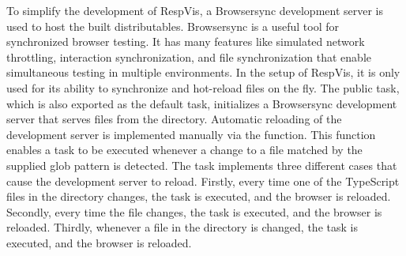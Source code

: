 To simplify the development of RespVis, a Browsersync
\parencite{Browsersync} development server is used to host the built
distributables.  Browsersync is a useful tool for synchronized browser
testing.  It has many features like simulated network throttling,
interaction synchronization, and file synchronization that enable
simultaneous testing in multiple environments.  In the setup of
RespVis, it is only used for its ability to synchronize and hot-reload
files on the fly.  The public  task, which is also
exported as the default task, initializes a Browsersync development
server that serves files from the  directory.  Automatic
reloading of the development server is implemented manually via the
 function.  This function enables a task to be
executed whenever a change to a file matched by the supplied glob
pattern is detected.  The  task implements three different
cases that cause the development server to reload.  Firstly, every
time one of the TypeScript files in the  directory
changes, the  task is executed, and the browser is
reloaded.  Secondly, every time the  file
changes, the  task is executed, and the browser is
reloaded.  Thirdly, whenever a file in the 
directory is changed, the  task is executed, and
the browser is reloaded.


